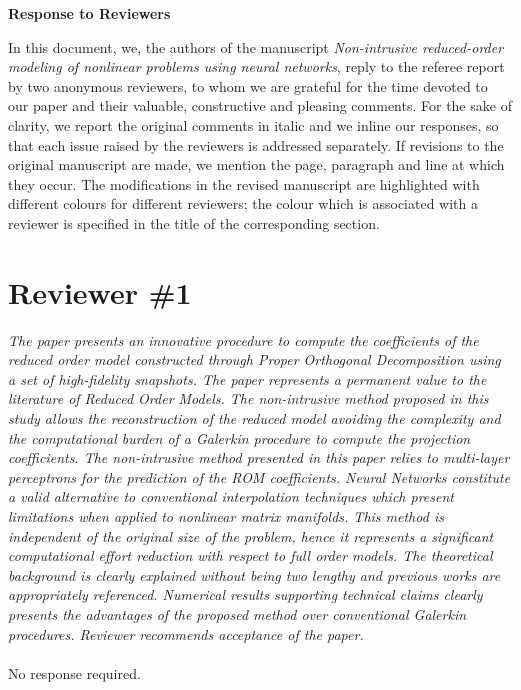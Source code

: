 \documentclass[longtitle]{elsarticle}
\theoremstyle{theorem}
\theoremstyle{definition}
\theoremstyle{remark}
\theoremstyle{proposition}
\numberwithin{figure}{section}
\begin{document}
	\Large{\textbf{Response to Reviewers}} \\
	\normalsize


	In this document, we, the authors of the manuscript \emph{Non-intrusive reduced-order modeling of nonlinear problems using neural networks}, reply to the referee report by two anonymous reviewers, to whom we are grateful for the time devoted to our paper and their valuable, constructive and pleasing comments. For the sake of clarity, we report the original comments in italic and we inline our responses, so that each issue raised by the reviewers is addressed separately. If revisions to the original manuscript are made, we mention the page, paragraph and line at which they occur. The modifications in the revised manuscript are highlighted with different colours for different reviewers; the colour which is associated with a reviewer is specified in the title of the corresponding section.


	\section*{Reviewer \#1}
		\emph{The paper presents an innovative procedure to compute the coefficients of the reduced order model constructed through Proper Orthogonal Decomposition using a set of high-fidelity snapshots. The paper represents a permanent value to the literature of Reduced Order Models. The non-intrusive method proposed in this study allows the reconstruction of the reduced model avoiding the complexity and the computational burden of a Galerkin procedure to compute the projection coefficients. The non-intrusive method presented in this paper relies to multi-layer perceptrons for the prediction of the ROM coefficients. Neural Networks constitute a valid alternative to conventional interpolation techniques which present limitations when applied to nonlinear matrix manifolds. This method is independent of the original size of the problem, hence it represents a significant computational effort reduction with respect to full order models. The theoretical background is clearly explained without being two lengthy and previous works are appropriately referenced. Numerical results supporting technical claims clearly presents the advantages of the proposed method over conventional Galerkin procedures. Reviewer recommends acceptance of the paper.} \\ \\
		No response required.
\end{document}
